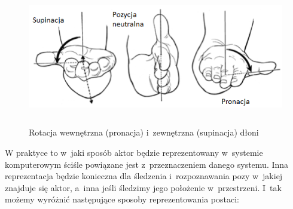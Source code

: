 \begin{savenotes}
	\begin{figure}[!htb]
		\centering	
		\includegraphics[height=6cm]{images/Wrist_joint_rotation.png}
		\caption[Rotacja wewnętrzna (pronacja) i~zewnętrzna (supinacja) dłoni]{Rotacja wewnętrzna (pronacja) i~zewnętrzna (supinacja) dłoni}	
		\label{fig:literature:wristRotation}
	\end{figure}
\end{savenotes}
															
W praktyce to w~jaki sposób aktor będzie reprezentowany w~systemie komputerowym ściśle powiązane jest z~przeznaczeniem danego systemu. Inna reprezentacja będzie konieczna dla śledzenia i~rozpoznawania pozy w~jakiej znajduje się aktor, a~inna jeśli śledzimy jego położenie w~przestrzeni. I~tak możemy wyróżnić następujące sposoby reprezentowania postaci:
																
